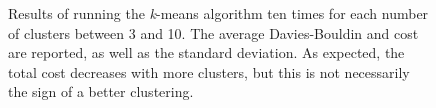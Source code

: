 \documentclass[
  letterpaper,
]{scrbook}
\begin{document}
\begin{figure}[pbt]


\caption{\label{fig-kmeans-tuning}Results of running the \emph{k}-means
algorithm ten times for each number of clusters between 3 and 10. The
average Davies-Bouldin and cost are reported, as well as the standard
deviation. As expected, the total cost decreases with more clusters, but
this is not necessarily the sign of a better clustering.}

\end{figure}%
\end{document}

